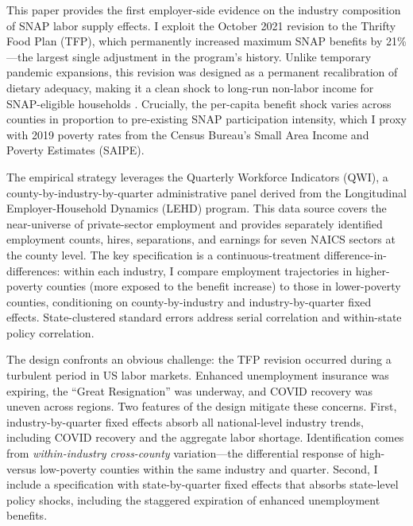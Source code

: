 \documentclass[12pt]{article}
\begin{document}
This paper provides the first employer-side evidence on the industry composition of SNAP labor supply effects. I exploit the October 2021 revision to the Thrifty Food Plan (TFP), which permanently increased maximum SNAP benefits by 21\%---the largest single adjustment in the program's history. Unlike temporary pandemic expansions, this revision was designed as a permanent recalibration of dietary adequacy, making it a clean shock to long-run non-labor income for SNAP-eligible households \citep{usda2021}. Crucially, the per-capita benefit shock varies across counties in proportion to pre-existing SNAP participation intensity, which I proxy with 2019 poverty rates from the Census Bureau's Small Area Income and Poverty Estimates (SAIPE).

The empirical strategy leverages the Quarterly Workforce Indicators (QWI), a county-by-industry-by-quarter administrative panel derived from the Longitudinal Employer-Household Dynamics (LEHD) program. This data source covers the near-universe of private-sector employment and provides separately identified employment counts, hires, separations, and earnings for seven NAICS sectors at the county level. The key specification is a continuous-treatment difference-in-differences: within each industry, I compare employment trajectories in higher-poverty counties (more exposed to the benefit increase) to those in lower-poverty counties, conditioning on county-by-industry and industry-by-quarter fixed effects. State-clustered standard errors address serial correlation and within-state policy correlation.

The design confronts an obvious challenge: the TFP revision occurred during a turbulent period in US labor markets. Enhanced unemployment insurance was expiring, the ``Great Resignation'' was underway, and COVID recovery was uneven across regions. Two features of the design mitigate these concerns. First, industry-by-quarter fixed effects absorb all national-level industry trends, including COVID recovery and the aggregate labor shortage. Identification comes from \textit{within-industry cross-county} variation---the differential response of high- versus low-poverty counties within the same industry and quarter. Second, I include a specification with state-by-quarter fixed effects that absorbs state-level policy shocks, including the staggered expiration of enhanced unemployment benefits.
\end{document}
